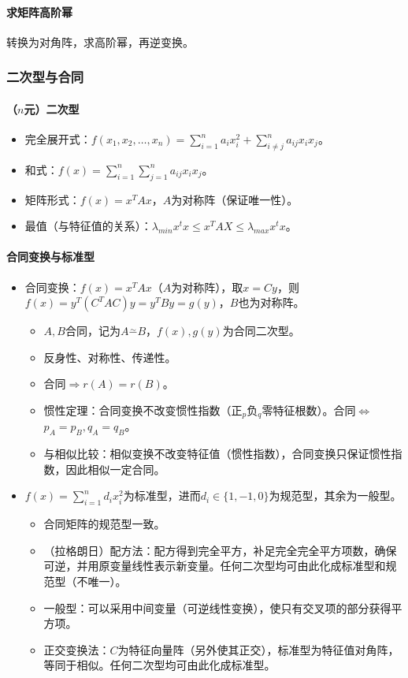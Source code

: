 \documentclass[
12pt, %
a4paper, 
oneside, %
headinclude,footinclude, %
]{scrartcl}
\begin{document}
\paragraph{求矩阵高阶幂}
转换为对角阵，求高阶幂，再逆变换。
\subsubsection[二次型与合同]{二次型与合同}
\paragraph{（$ n $元）二次型}
\begin{itemize}
\item 完全展开式：$ f(x_1, x_2, \dots, x_n) = \sum_{i = 1}^n a_ix_i^2 + \sum_{i \neq j}^n a_{ij}x_ix_j $。
\item 和式：$ f(x) = \sum_{i = 1}^n\sum_{j = 1}^n a_{ij}x_ix_j $。
\item 矩阵形式：$ f(x) = x^TAx $，$ A $为对称阵（保证唯一性）。
\item 最值（与特征值的关系）：$ \lambda_{min}x^tx \leq x^TAX \leq \lambda_{max}x^tx $。
\end{itemize}
\paragraph{合同变换与标准型}
\begin{itemize}
\item 合同变换：$ f(x) = x^TAx $（$ A $为对称阵），取$ x = Cy $，则$ f(x) = y^T(C^TAC)y = y^TBy = g(y) $，$ B $也为对称阵。
\begin{itemize}
\item $ A,B $合同，记为$ A \overset{\sim}{-} B $，$ f(x),g(y) $为合同二次型。
\item 反身性、对称性、传递性。
\item 合同$ \Rightarrow $$ r(A) = r(B) $。
\item 惯性定理：合同变换不改变惯性指数（正$ _p $负$ _q $零特征根数）。合同$ \Leftrightarrow $$ p_A = p_B, q_A = q_B $。
\item 与相似比较：相似变换不改变特征值（惯性指数），合同变换只保证惯性指数，因此相似一定合同。
\end{itemize}
\item $ f(x) = \sum_{i = 1}^n d_ix_i^2 $为标准型，进而$ d_i \in \{1, -1, 0\} $为规范型，其余为一般型。
\begin{itemize}
\item 合同矩阵的规范型一致。
\item （拉格朗日）配方法：配方得到完全平方，补足完全完全平方项数，确保可逆，并用原变量线性表示新变量。任何二次型均可由此化成标准型和规范型（不唯一）。
\item 一般型：可以采用中间变量（可逆线性变换），使只有交叉项的部分获得平方项。
\item 正交变换法：$ C $为特征向量阵（另外使其正交），标准型为特征值对角阵，等同于相似。任何二次型均可由此化成标准型。
\end{itemize}
\end{itemize}
\end{document}
